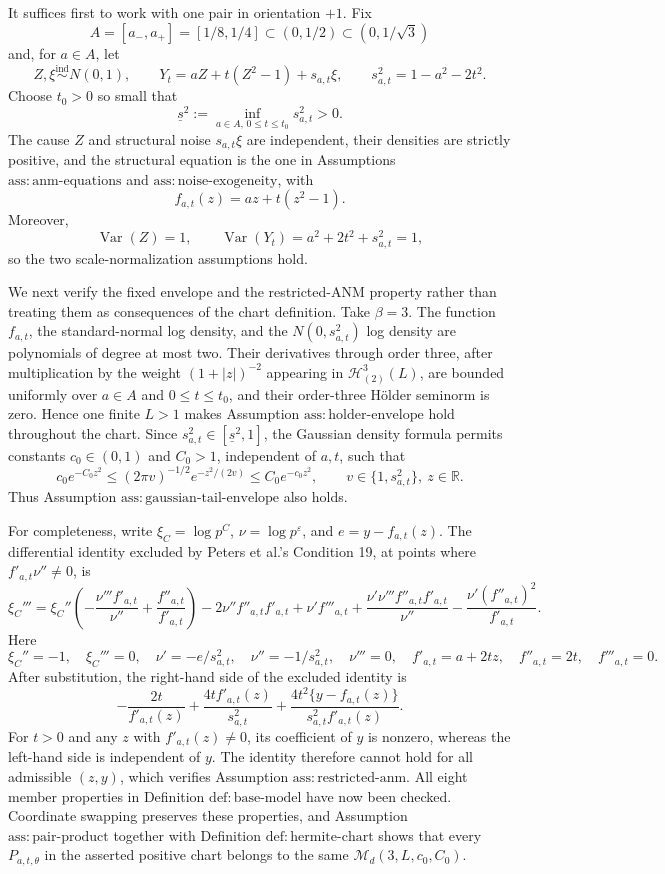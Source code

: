 It suffices first to work with one pair in orientation \(+1\).  Fix
\[
A=[a_-,a_+]=[1/8,1/4]\subset(0,1/2)\subset(0,1/\sqrt 3)
\]
and, for \(a\in A\), let
\[
Z,\xi\stackrel{\mathrm{ind}}{\sim}N(0,1),\qquad
Y_t=aZ+t(Z^2-1)+s_{a,t}\xi,\qquad
s_{a,t}^2=1-a^2-2t^2.
\]
Choose \(t_0>0\) so small that
\[
\underline s^2:=\inf_{a\in A,\,0\le t\le t_0}s_{a,t}^2>0.
\]
The cause \(Z\) and structural noise \(s_{a,t}\xi\) are independent, their densities are strictly positive, and the structural equation is the one in Assumptions \(\mathrm{ass:anm\text{-}equations}\) and \(\mathrm{ass:noise\text{-}exogeneity}\), with
\[
f_{a,t}(z)=az+t(z^2-1).
\]
Moreover,
\[
\operatorname{Var}(Z)=1,\qquad
\operatorname{Var}(Y_t)=a^2+2t^2+s_{a,t}^2=1,
\]
so the two scale-normalization assumptions hold.

We next verify the fixed envelope and the restricted-ANM property rather than treating them as consequences of the chart definition.  Take \(\beta=3\).  The function \(f_{a,t}\), the standard-normal log density, and the \(N(0,s_{a,t}^2)\) log density are polynomials of degree at most two.  Their derivatives through order three, after multiplication by the weight \((1+|z|)^{-2}\) appearing in \(\mathcal H_{(2)}^3(L)\), are bounded uniformly over \(a\in A\) and \(0\le t\le t_0\), and their order-three H\"older seminorm is zero.  Hence one finite \(L>1\) makes Assumption \(\mathrm{ass:holder\text{-}envelope}\) hold throughout the chart.  Since \(s_{a,t}^2\in[\underline s^2,1]\), the Gaussian density formula permits constants \(c_0\in(0,1)\) and \(C_0>1\), independent of \(a,t\), such that
\[
c_0e^{-C_0z^2}\le (2\pi v)^{-1/2}e^{-z^2/(2v)}\le C_0e^{-c_0z^2},\qquad
v\in\{1,s_{a,t}^2\},\ z\in\mathbb R.
\]
Thus Assumption \(\mathrm{ass:gaussian\text{-}tail\text{-}envelope}\) also holds.

For completeness, write \(\xi_C=\log p^C\), \(\nu=\log p^\varepsilon\), and \(e=y-f_{a,t}(z)\).  The differential identity excluded by Peters et al.'s Condition 19, at points where \(f'_{a,t}\nu''\ne0\), is
\[
\xi_C'''=\xi_C''\left(-\frac{\nu'''f'_{a,t}}{\nu''}+\frac{f''_{a,t}}{f'_{a,t}}\right)
-2\nu''f''_{a,t}f'_{a,t}+\nu'f'''_{a,t}
+\frac{\nu'\nu'''f''_{a,t}f'_{a,t}}{\nu''}
-\frac{\nu'(f''_{a,t})^2}{f'_{a,t}}.
\]
Here
\[
\xi_C''=-1,\quad \xi_C'''=0,\quad
\nu'=-e/s_{a,t}^2,\quad \nu''=-1/s_{a,t}^2,\quad \nu'''=0,\quad
f'_{a,t}=a+2tz,\quad f''_{a,t}=2t,\quad f'''_{a,t}=0.
\]
After substitution, the right-hand side of the excluded identity is
\[
-\frac{2t}{f'_{a,t}(z)}+\frac{4t f'_{a,t}(z)}{s_{a,t}^2}
+\frac{4t^2\{y-f_{a,t}(z)\}}{s_{a,t}^2f'_{a,t}(z)}.
\]
For \(t>0\) and any \(z\) with \(f'_{a,t}(z)\ne0\), its coefficient of \(y\) is nonzero, whereas the left-hand side is independent of \(y\).  The identity therefore cannot hold for all admissible \((z,y)\), which verifies Assumption \(\mathrm{ass:restricted\text{-}anm}\).  All eight member properties in Definition \(\mathrm{def:base\text{-}model}\) have now been checked.  Coordinate swapping preserves these properties, and Assumption \(\mathrm{ass:pair\text{-}product}\) together with Definition \(\mathrm{def:hermite\text{-}chart}\) shows that every \(P_{a,t,\theta}\) in the asserted positive chart belongs to the same \(\mathcal M_d(3,L,c_0,C_0)\).

